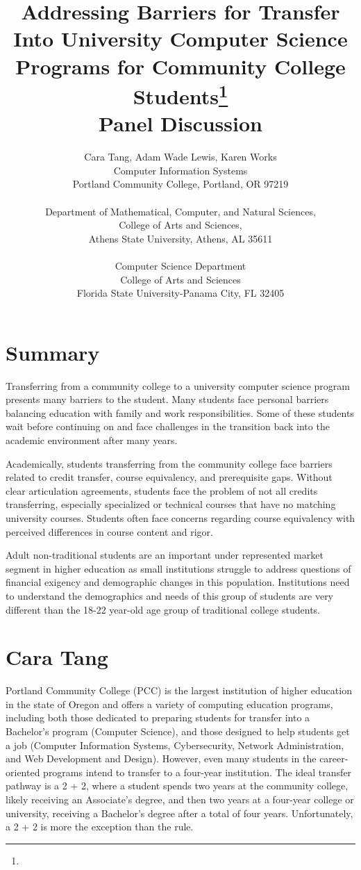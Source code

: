 \documentclass{article}
\title{Addressing Barriers for Transfer Into University Computer Science
  Programs for Community College
  Students\footnote{\protect}
\\
\vspace{0.2in}
\large Panel Discussion
}
\author{
Cara Tang\affmark[1], Adam Wade Lewis\affmark[2], Karen Works\affmark[3]\\
\affmark[1]Computer Information Systems\\
Portland Community College, Portland, OR 97219\\
\email{cara.tang@pcc.edu}\\
\affmark[2]Department of Mathematical, Computer, and Natural Sciences,\\
College of Arts and Sciences,\\
Athens State University, Athens, AL 35611\\
\email{Adam.Lewis@athens.edu}\\
Computer Science Department\\
College of Arts and Sciences\\
Florida State University-Panama City, FL 32405\\
\email{keworks@fsu.edu}
}
\begin{document}
\maketitle

\section{Summary}
Transferring from a community college to a university computer science
program presents many barriers to the student. Many  students face
personal barriers balancing education with family and work
responsibilities.  Some of these students wait before continuing on and
face challenges in the transition back into the academic environment
after many years.

Academically, students transferring from the community college face
barriers related to credit transfer, course equivalency, and
prerequisite gaps. Without clear articulation agreements, students face
the problem of not all credits transferring, especially specialized or
technical courses that have no matching university courses. Students
often face concerns regarding course equivalency with perceived
differences in course content and rigor.

Adult non-traditional students are an important under represented  market segment
in higher education as small institutions struggle to address questions
of financial exigency and demographic changes in this population.
Institutions need to understand the demographics and needs of this group
of students are very different than the 18-22 year-old age group of
traditional college students.

\section{Cara Tang}
Portland Community College (PCC) is the largest institution of higher
education in the state of Oregon and offers a variety of computing
education programs, including both those dedicated to preparing students
for transfer into a Bachelor's program (Computer Science), and those
designed to help students get a job (Computer Information Systems,
Cybersecurity, Network Administration, and Web Development and
Design). However, even many students in the career-oriented programs
intend to transfer to a four-year institution. The ideal transfer
pathway is a 2 + 2, where a student spends two years at the community
college, likely receiving an Associate's degree, and then two years at a
four-year college or university, receiving a Bachelor's degree after a
total of four years. Unfortunately, a 2 + 2 is more the exception than
the rule.
\end{document}
